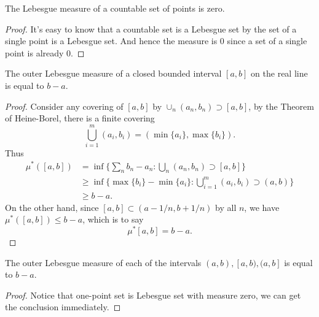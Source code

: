 \begin{pro}%
	The Lebesgue measure of a countable set of points is zero.
\end{pro}
\begin{proof}
	It's easy to know that a countable set is a Lebesgue set by the set of a single point is a Lebesgue set.
	And hence the measure is $0$ since a set of a single point is already $0$.
\end{proof}

\begin{pro}%
	The outer Lebesgue measure of a closed bounded interval $[a,b]$ on the real line is equal to $b-a$.
\end{pro}
\begin{proof}
	Consider any covering of $[a,b]$  by $\cup_{n} (a_n,b_n)\supset [a,b]$, by the Theorem of Heine-Borel, there is a finite covering 
	\[\bigcup_{i=1}^{m}(a_i,b_i)=(\min\{a_i\},\max\{b_i\}).\]
	Thus 
	\begin{align*}
		\mu^*([a,b])&=\inf\{\sum_{n} b_n-a_n\colon \bigcup_{n}(a_n,b_n)\supset [a,b]\}\\
		 			&\geq \inf\{\max\{b_i\}-\min\{a_i\}\colon \bigcup_{i=1}^m (a_i,b_i)\supset (a,b)\}\\
		 			&\geq b-a.
	\end{align*}
	On the other hand, since $[a,b]\subset(a-1/n,b+1/n)$  by all $n$, we have $\mu^*([a,b])\leq b-a$, which is to say
	\[\mu^*[a,b]=b-a.\]
\end{proof}

\begin{pro}%
	The outer Lebesgue measure of each of the intervals $(a,b),[a,b),(a,b]$ is equal to $b-a$.
\end{pro}
\begin{proof}
	Notice that one-point set is Lebesgue set with measure zero, we can get the conclusion immediately.
\end{proof}

